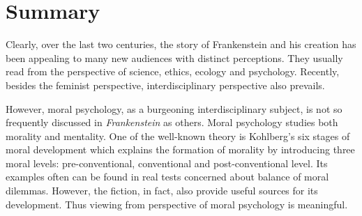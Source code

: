 \section{Summary} %
\label{sec:summary_literature}
\begin{text}

Clearly, over the last two centuries, the story of Frankenstein and his creation has been appealing to many new audiences with distinct perceptions. They usually read from the perspective of science, ethics, ecology and psychology. Recently, besides the feminist perspective, interdisciplinary perspective also prevails.

However, moral psychology, as a burgeoning interdisciplinary subject, is not so frequently discussed in \textit{Frankenstein} as others. Moral psychology studies both morality and mentality. One of the well-known theory is Kohlberg's six stages of moral development which explains the formation of morality by introducing three moral levels: pre-conventional, conventional and post-conventional level. Its examples often can be found in real tests concerned about balance of moral dilemmas. However, the fiction, in fact, also provide useful sources for its development. Thus viewing from perspective of moral psychology is meaningful.

\end{text}


